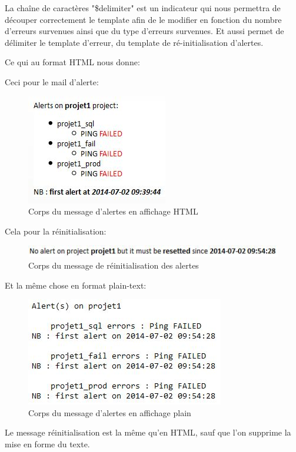 La chaîne de caractères "\$delimiter" est un indicateur qui nous permettra de découper correctement le template afin de le modifier en fonction du nombre d'erreurs survenues ainsi que du type d'erreurs survenues. Et aussi permet de délimiter le template d'erreur, du template de ré-initialisation d'alertes.

Ce qui au format HTML nous donne:

Ceci pour le mail d'alerte:

\begin{figure}[h!]
	\centering
	\includegraphics[scale=1]{images/alert_mail_html.jpg}
	\caption{Corps du message d'alertes en affichage HTML}
\end{figure}

Cela pour la réinitialisation:

\begin{figure}[h!]
	\centering
	\includegraphics[scale=1]{images/mail_reset_html.jpg}
	\caption{Corps du message de réinitialisation des alertes}
\end{figure}


Et la même chose en format plain-text:

\begin{figure}[h!]
	\centering
	\includegraphics[scale=1]{images/alert_mail_plain.jpg}
	\caption{Corps du message d'alertes en affichage plain}
\end{figure}

Le message réinitialisation est la même qu'en HTML, sauf que l'on supprime la mise en forme du texte.

